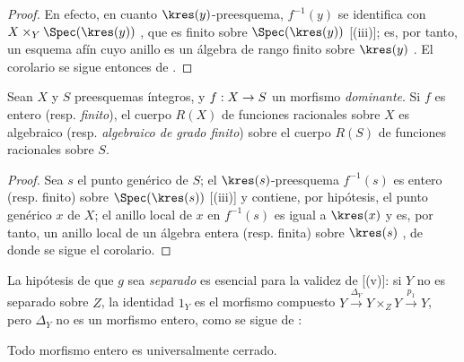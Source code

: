 \documentclass[oneside,10pt]{amsart}
\makeatletter
\newcommand{\ega@arrow}[2]{\mathchoice{#1}{#2}{#2}{#2}}
\renewcommand{\to}{\ega@arrow{\longrightarrow}{\rightarrow}}
\let\EGAOriginalLabel\label
\renewcommand{\label}[1]{\phantomsection\EGAOriginalLabel{#1}}
\makeatother
\begin{document}
\begin{proof}
En efecto, en cuanto $\kres(y)$-preesquema, $f^{-1}(y)$ se identifica con $X\times_Y\Spec(\kres(y))$ , que es finito sobre $\Spec(\kres(y))$ [(iii)];
es, por tanto, un esquema afín cuyo anillo es un álgebra de rango finito sobre $\kres(y)$ .
El corolario se sigue entonces de .
\end{proof}

\begin{corollary}[6.1.8]
\label{II.6.1.8}
Sean $X$ y $S$ preesquemas íntegros, y $f:X\to S$ un morfismo \emph{dominante}.
Si $f$ es entero \textup{(resp. \emph{finito})}, el cuerpo $R(X)$ de funciones racionales sobre $X$ es algebraico \textup{(resp. \emph{algebraico de grado finito})} sobre el cuerpo $R(S)$ de funciones racionales sobre $S$.
\end{corollary}

\begin{proof}
Sea $s$ el punto genérico de $S$;
el $\kres(s)$-preesquema $f^{-1}(s)$ es entero (resp. finito) sobre $\Spec(\kres(s))$ [(iii)] y contiene, por hipótesis, el punto genérico $x$ de $X$;
el anillo local de $x$ en $f^{-1}(s)$ es igual a $\kres(x)$  y es, por tanto, un anillo local de un álgebra entera (resp. finita) sobre $\kres(s)$ , de donde se sigue el corolario.
\end{proof}

\begin{remark}[6.1.9]
\label{II.6.1.9}
La hipótesis de que $g$ sea \emph{separado} es esencial para la validez de [(v)]: si $Y$ no es separado sobre $Z$, la identidad $1_Y$ es el morfismo compuesto $Y\xrightarrow{\Delta_Y}Y\times_Z Y\xrightarrow{p_1}Y$, pero $\Delta_Y$ no es un morfismo entero, como se sigue de :
\end{remark}

\begin{proposition}[6.1.10]
\label{II.6.1.10}
Todo morfismo entero es universalmente cerrado.
\end{proposition}
\end{document}
